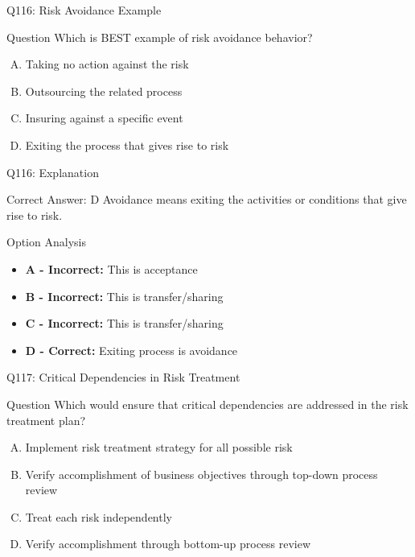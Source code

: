 \documentclass{beamer}
\begin{document}
	\begin{frame}{Q116: Risk Avoidance Example}
		\begin{block}{Question}
			Which is BEST example of risk avoidance behavior?
		\end{block}
		\begin{enumerate}[(A)]
			\item Taking no action against the risk
			\item Outsourcing the related process
			\item Insuring against a specific event
			\item Exiting the process that gives rise to risk
		\end{enumerate}
	\end{frame}
	
	\begin{frame}{Q116: Explanation}
		\begin{block}{Correct Answer: D}
			Avoidance means exiting the activities or conditions that give rise to risk.
		\end{block}
		\begin{block}{Option Analysis}
			\begin{itemize}
				\item \textbf{A - Incorrect:} This is acceptance
				\item \textbf{B - Incorrect:} This is transfer/sharing
				\item \textbf{C - Incorrect:} This is transfer/sharing
				\item \textbf{D - Correct:} Exiting process is avoidance
			\end{itemize}
		\end{block}
	\end{frame}
	
	\begin{frame}{Q117: Critical Dependencies in Risk Treatment}
		\begin{block}{Question}
			Which would ensure that critical dependencies are addressed in the risk treatment plan?
		\end{block}
		\begin{enumerate}[(A)]
			\item Implement risk treatment strategy for all possible risk
			\item Verify accomplishment of business objectives through top-down process review
			\item Treat each risk independently
			\item Verify accomplishment through bottom-up process review
		\end{enumerate}
	\end{frame}
	
\end{document}
